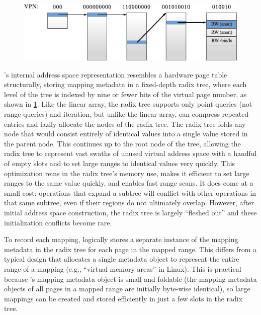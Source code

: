 \begin{figure}
  \centering
  \includegraphics{figures/radix.pdf}
  \label{fig:radix}
\end{figure}

\vm's internal address space representation resembles a hardware page table
structurally, storing mapping metadata in a fixed-depth radix tree,
where each level of the tree is indexed by nine or fewer bits of the
virtual page number, as shown in \cref{fig:radix}.  Like the linear array,
the radix tree supports only point queries (not range queries) and
iteration, but unlike the linear array, \vm can compress repeated
entries and lazily allocate the nodes of the radix tree.
%
The radix tree folds any node that would consist entirely of identical
values into a single value stored in the parent node.  This continues up to
the root node of the tree, allowing the radix tree to represent vast
swaths of unused virtual address space with a handful of empty slots
and to set large ranges to identical values very quickly.
%
This optimization reins in the radix tree's memory use, makes it
efficient to set large ranges to the same value quickly, and enables
fast range scans.
%
It does come at a small cost: operations that expand a subtree will
conflict with other operations in that same subtree, even if their
regions do not ultimately overlap.  However, after initial address
space construction, the radix tree is largely ``fleshed out'' and
these initialization conflicts become rare.

To record each mapping, \vm logically stores a separate instance of
the mapping metadata
in the radix tree for each page in the mapped range.  This differs
from a typical design that allocates a single metadata object
to represent the entire range of a mapping (e.g., ``virtual memory
areas'' in Linux).
%
This is practical because \vm's mapping metadata object is small and
foldable (the mapping metadata objects of all pages in a mapped range
are initially byte-wise identical), so large mappings can be
created and stored efficiently in just a few slots in the radix tree.

